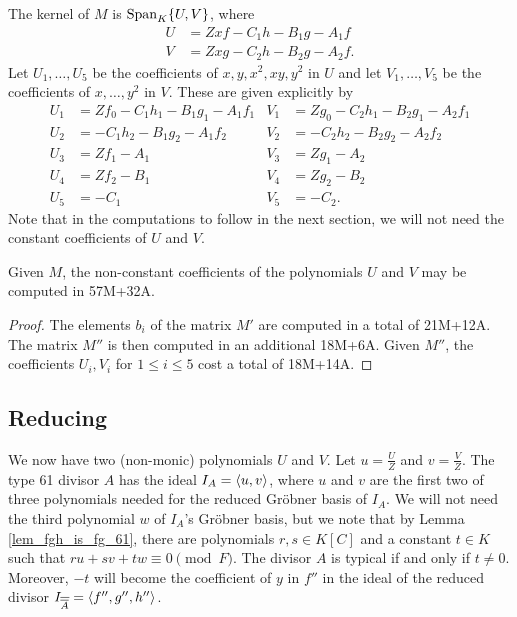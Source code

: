 The kernel of $M$ is $\operatorname{Span}_K\{U,V\}$, where
\begin{align*}
  U &= Zxf - C_1h - B_1g - A_1f \\
  V &= Zxg - C_2h - B_2g - A_2f.
\end{align*}
Let $U_1, \ldots, U_5$ be the coefficients of $x, y, x^2, xy, y^2$ in $U$
and let $V_1, \ldots, V_5$ be the coefficients of $x, \ldots, y^2$ in $V$.
These are given explicitly by
\begin{align*}
  U_1 &= Zf_0 - C_1h_1 - B_1g_1 - A_1f_1 & V_1 &= Zg_0 - C_2h_1 - B_2g_1 - A_2f_1 \\
  U_2 &=      - C_1h_2 - B_1g_2 - A_1f_2 & V_2 &=      - C_2h_2 - B_2g_2 - A_2f_2 \\
  U_3 &= Zf_1 - A_1 & V_3 &= Zg_1 - A_2 \\
  U_4 &= Zf_2 - B_1 & V_4 &= Zg_2 - B_2 \\
  U_5 &=      - C_1 & V_5 &=      - C_2.
\end{align*}
Note that in the computations to follow in the next section,
we will not need the constant coefficients of $U$ and $V$.

\begin{lemma}
  \label{lem_UV_op_count}
  Given $M$, the non-constant coefficients of the polynomials $U$ and $V$ may be computed in 57M+32A.
\end{lemma}
\begin{proof}
  The elements $b_i$ of the matrix $M'$ are computed in a total of 21M+12A.
  The matrix $M''$ is then computed in an additional 18M+6A.
  Given $M''$, the coefficients $U_i, V_i$ for $1 \leq i \leq 5$ cost a total of 18M+14A.
\end{proof}




\subsection{Reducing}
\label{sec_reducing}

We now have two (non-monic) polynomials $U$ and $V$.
Let $u = \frac U Z$ and $v = \frac V Z$.
The type 61 divisor $A$ has the ideal $I_A = \left\langle u, v \right\rangle$,
where $u$ and $v$ are the first two of three polynomials needed for the reduced Gr\"obner basis of $I_A$.
We will not need the third polynomial $w$ of $I_A$'s Gr\"obner basis,
but we note that by Lemma \ref{lem_fgh_is_fg_61},
there are polynomials $r,s \in K[C]$ and a constant $t \in K$
such that $ru + sv + tw \equiv 0 \pmod F$.
The divisor $A$ is typical if and only if $t \neq 0$.
Moreover, $-t$ will become the coefficient of $y$ in $f''$ in the ideal of the reduced divisor
$I_{\overline{\overline{A}}} = \left\langle f'', g'', h'' \right\rangle$.


